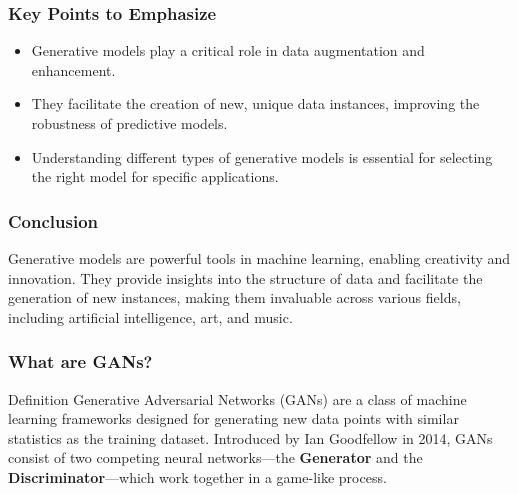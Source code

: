 \documentclass[aspectratio=169]{beamer}
\begin{document}
\begin{frame}[fragile]
    \frametitle{Key Points to Emphasize}
    \begin{itemize}
        \item Generative models play a critical role in data augmentation and enhancement.
        \item They facilitate the creation of new, unique data instances, improving the robustness of predictive models.
        \item Understanding different types of generative models is essential for selecting the right model for specific applications.
    \end{itemize}
\end{frame}

\begin{frame}[fragile]
    \frametitle{Conclusion}
    Generative models are powerful tools in machine learning, enabling creativity and innovation. They provide insights into the structure of data and facilitate the generation of new instances, making them invaluable across various fields, including artificial intelligence, art, and music.
\end{frame}

\begin{frame}[fragile]
    \frametitle{What are GANs?}
    \begin{block}{Definition}
        Generative Adversarial Networks (GANs) are a class of machine learning frameworks designed for generating new data points with similar statistics as the training dataset. Introduced by Ian Goodfellow in 2014, GANs consist of two competing neural networks—the \textbf{Generator} and the \textbf{Discriminator}—which work together in a game-like process.
    \end{block}
\end{frame}
\end{document}
